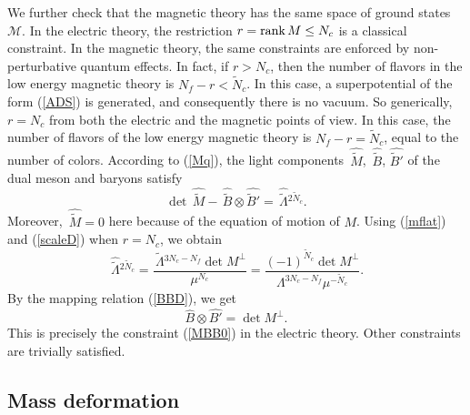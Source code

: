 \documentclass[lecture]{qft-l}
\newcommand{\Lam}{\varLambda}
\newcommand{\rank}{{\rm rank\,}}
\newcommand{\MM}{{\mathcal M}}
\newcommand{\BT}{B'}%
\newcommand{\ND}{\tilde{N}_c}
\newcommand{\MD}{\tilde{M}}
\newcommand{\BD}{\tilde{B}}
\newcommand{\BDT}{\tilde{B}'}
\newcommand{\MDh}{\,\hat{\!\MD}}
\newcommand{\BDh}{\,\hat{\!\BD}}
\newcommand{\BDTh}{\hat{\BDT}}
\newcommand{\LamD}{\,\tilde{\!\Lam}{}}
\newcommand{\LamDh}{\,\hat{\tilde{\!\Lam}}{}}
\numberwithin{figure}{chapter}
\begin{document}
We further check that the magnetic theory has the same space of ground states
$\MM$.
In the electric theory, the restriction $r=\rank M\le N_c$ is a classical 
constraint.
In the magnetic theory, the same constraints are enforced by non-perturbative
quantum effects.
In fact, if $r>N_c$, then the number of flavors in the low energy magnetic
theory is $N_f-r<\ND$.
In this case, a superpotential of the form (\ref{ADS}) is generated,
and consequently there is no vacuum.
So generically, $r=N_c$ from both the electric and the magnetic points of view.
In this case, the number of flavors of the low energy magnetic theory is
$N_f-r=\ND$, equal to the number of colors.
According to (\ref{Mq}), the light components $\MDh$, $\BDh$, $\BDTh$ 
of the dual meson and baryons satisfy
	\begin{equation}
\det\MDh-\BDh\otimes\BDTh=\LamDh^{2\ND}.
	\end{equation}
Moreover, $\MDh=0$ here because of the equation of motion of $M$.
Using (\ref{mflat}) and (\ref{scaleD}) when $r=N_c$, we obtain
	\begin{equation}
\LamDh^{2\ND}=\frac{\LamD^{3N_c-N_f}\det M^\perp}{\mu^{N_c}}
=\frac{(-1)^{\ND}\det M^\perp}{\Lam^{3N_c-N_f}\mu^{-\ND}}.
	\end{equation}
By the mapping relation (\ref{BBD}), we get
	\begin{equation}
\hat{B}\otimes\hat{\BT}=\det M^\perp.
	\end{equation}
This is precisely the constraint (\ref{MBB0}) in the electric theory.
Other constraints are trivially satisfied.

\medskip\noindent
\subsection{ Mass deformation}
\end{document}

